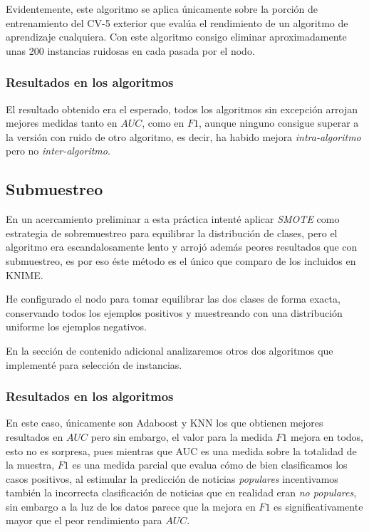 \documentclass{article}
\newcommand{\img}[2]{
\noindent\makebox[\textwidth][c]{\texttt{[image: \#1]}}%
}
\begin{document}

\img{ipf}{1}

Evidentemente, este algoritmo se aplica únicamente sobre la porción de entrenamiento del CV-5 exterior que evalúa el rendimiento de un algoritmo de aprendizaje cualquiera. Con este algoritmo consigo eliminar aproximadamente unas 200 instancias ruidosas en cada pasada por el nodo.

\subsubsection{Resultados en los algoritmos}

\img{ruidoimpu}{1.2}

El resultado obtenido era el esperado, todos los algoritmos sin excepción arrojan mejores medidas tanto en $AUC$, como en $F1$, aunque ninguno consigue superar a la versión con ruido de otro algoritmo, es decir, ha habido mejora \textit{intra-algoritmo} pero no \textit{inter-algoritmo}.

\subsection{Submuestreo}

En un acercamiento preliminar a esta práctica intenté aplicar \textit{SMOTE} como estrategia de sobremuestreo para equilibrar la distribución de clases, pero el algoritmo era escandalosamente lento y arrojó además peores resultados que con submuestreo, es por eso éste método es el único que comparo de los incluidos en KNIME.

\img{downsample}{0.6}

He configurado el nodo para tomar equilibrar las dos clases de forma exacta, conservando todos los ejemplos positivos y muestreando con una distribución uniforme los ejemplos negativos.

En la sección de contenido adicional analizaremos otros dos algoritmos que implementé para selección de instancias.

\subsubsection{Resultados en los algoritmos}

\img{downres}{1.2}

En este caso, únicamente son Adaboost y KNN los que obtienen mejores resultados en $AUC$ pero sin embargo, el valor para la medida $F1$ mejora en todos, esto no es sorpresa, pues mientras que AUC es una medida sobre la totalidad de la muestra, $F1$ es una medida parcial que evalua cómo de bien clasificamos los casos positivos, al estimular la predicción de noticias \textit{populares} incentivamos también la incorrecta clasificación de noticias que en realidad eran \textit{no populares}, sin embargo a la luz de los datos parece que la mejora en $F1$ es significativamente mayor que el peor rendimiento para $AUC$.
\end{document}
